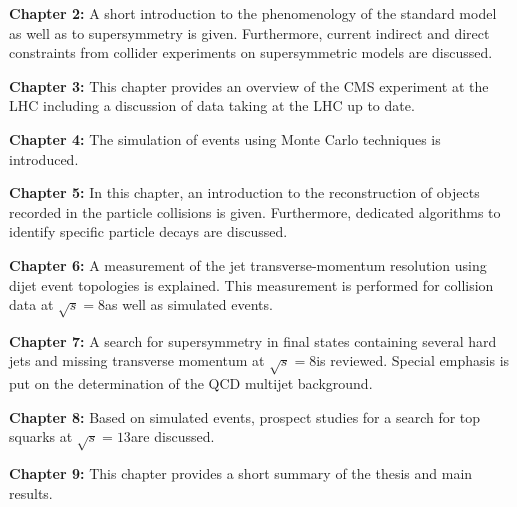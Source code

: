 \begin{description}
 \item \textbf{Chapter 2:} A short introduction to the phenomenology of the standard model as well as to supersymmetry is given. Furthermore, current indirect and direct constraints from collider experiments on supersymmetric models are discussed.
 \item \textbf{Chapter 3:} This chapter provides an overview of the CMS experiment at the LHC including a discussion of data taking at the LHC up to date.
 \item \textbf{Chapter 4:} The simulation of events using Monte Carlo techniques is introduced.
 \item \textbf{Chapter 5:} In this chapter, an introduction to the reconstruction of objects recorded in the particle collisions is given. Furthermore, dedicated algorithms to identify specific particle decays are discussed.
 \item \textbf{Chapter 6:} A measurement of the jet transverse-momentum resolution using dijet event topologies is explained. This measurement is performed for \pp collision data at $\sqrt{s} = 8$\tev as well as simulated events.
 \item \textbf{Chapter 7:} A search for supersymmetry in final states containing several hard jets and missing transverse momentum at $\sqrt{s} = 8$\tev is reviewed. Special emphasis is put on the determination of the QCD multijet background.
 \item \textbf{Chapter 8:} Based on simulated events, prospect studies for a search for top squarks at $\sqrt{s} = 13$\tev are discussed.
 \item \textbf{Chapter 9:} This chapter provides a short summary of the thesis and main results.
\end{description}
